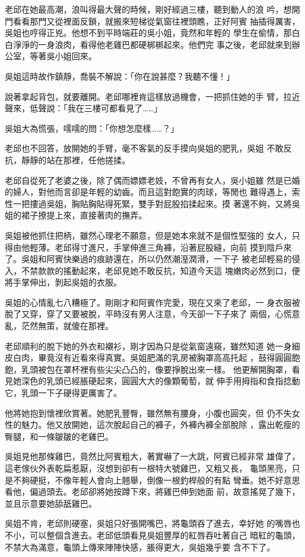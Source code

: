 老邱在她最高潮，浪叫得最大聲的時候，剛好經過三樓，聽到動人的浪
吟，想開門看看那門又從裡面反鎖，就搬來短梯從氣窗往裡頭瞧，正好阿賓
抽插得厲害，吳姐也哼得正兇。他想不到平時端莊的吳小姐，竟然和年輕的
學生在偷情，那白白淨淨的一身浪肉，看得他老雞巴都硬梆梆起來。他們完
事之後，老邱就來到辦公室，等著吳小姐回來。

吳姐這時故作鎮靜，喬裝不解說：「你在說甚麼？我聽不懂！」

說著拿起背包，就要離開。老邱哪裡肯這樣放過機會，一把抓住她的手
臂，拉近聲來，低聲說：「我在三樓可都看見了……」

吳姐大為慌張，嚅嚅的問：「你想怎麼樣……？」

老邱也不回答，放開她的手臂，毫不客氣的反手摸向吳姐的肥乳，吳姐
不敢反抗，靜靜的站在那裡，任他搓揉。

老邱自從死了老婆之後，除了偶而嫖嫖老妓，不曾再有女人，吳小姐雖
然是已婚的婦人，對他而言卻是年輕的幼齒。而且這對飽實的肉球，等閒也
難得遇上，索性一把摟過吳姐，胸貼胸貼得死緊，雙手對屁股掐揉起來。摸
著還不夠，又將吳姐的裙子撩提上來，直接著肉的撫弄。

吳姐被他抓住把柄，雖然心理老不願意，但是她本來就不是個性堅強的
女人，只得由他輕薄。老邱得寸進尺，手掌伸進三角褲，沿著屁股縫，向前
摸到陰戶來了。吳姐和阿賓快樂過的痕跡還在，所以仍然潮溼潤滑，一下子
被老邱輕易的侵入，不禁款款的搖動起來，老邱見她不敢反抗，知道今天這
塊嫩肉必然到口，便將手掌伸出，剝起吳姐的衣服。

吳姐的心情亂七八糟極了。剛剛才和阿賓作完愛，現在又來了老邱，一
身衣服被脫了又穿，穿了又要被脫，平時沒有男人注意，今天卻一下子來了
兩個，心慌意亂，茫然無策，就傻在那裡。

老邱順利的脫下她的外衣和襯衫，剛才因為只是從氣窗遠窺，雖然知道
她一身細皮白肉，畢竟沒有近看來得真實。吳姐肥滿的乳房被胸罩高高托起
，鼓得圓圓飽飽，乳頭被包在罩杯裡有些尖尖凸凸的，像要掙脫出來一樣。
他更解開胸罩，看見她深色的乳頭已經脹硬起來，圓圓大大的像顆葡萄，就
伸手用拇指和食指捻動它，乳頭一下子硬得更厲害了。

他將她抱到懷裡欣賞著。她肥乳豐臀，雖然無有腰身，小腹也圓突，但
仍不失女性的魅力。他又放開她，這次脫起自己的褲子，外褲內褲全部脫除
，露出乾瘦的臀腿，和一條皺皺的老雞巴。

吳姐見他那條雞巴，竟然比阿賓粗大，著實嚇了一大跳，阿賓已經非常
雄偉了，這老傢伙外表乾扁惹厭，沒想到卻有一根特大號雞巴，又粗又長，
龜頭黑亮，只是不夠硬挺，不像年輕人會向上翹舉，倒像一根釣桿般的有點
彎垂。她不好意思看他，偏過頭去。老邱卻將她按蹲下來，將雞巴伸到她面
前，故意搖晃了幾下，並且示意要她舔舐雞巴。

吳姐不肯，老邱則硬塞，吳姐只好張開嘴巴，將龜頭吞了進去，幸好她
的嘴唇也不小，可以整個含進去。老邱低頭看見吳姐豐厚的紅唇吞吐著自己
暗紅的龜頭，不禁大為滿意，龜頭上傳來陣陣快感，脹得更大，吳姐幾乎要
含不下了。

